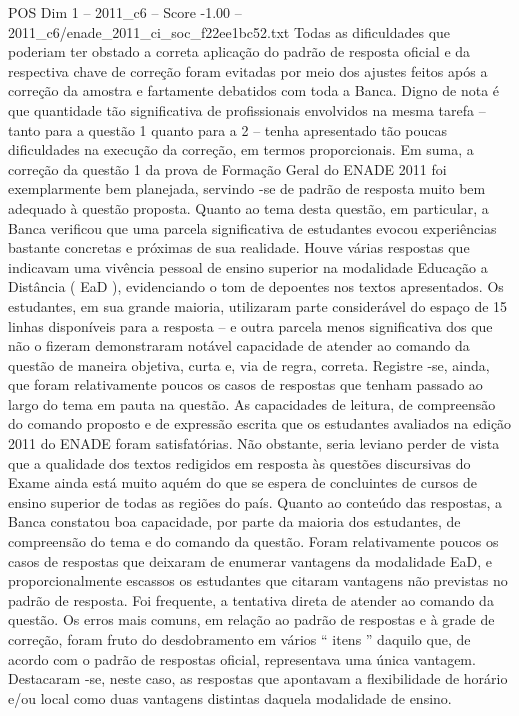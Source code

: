\begin{textsample}{POS Dim 1 – 2011\_c6 – Score -1.00 – 2011\_c6/enade\_2011\_ci\_soc\_f22ee1bc52.txt}
Todas as dificuldades que poderiam ter obstado a correta aplicação do padrão de resposta oficial e da respectiva chave de correção foram evitadas por meio dos ajustes feitos após a correção da amostra e fartamente debatidos com toda a Banca.
Digno de nota é que quantidade tão significativa de profissionais envolvidos na mesma tarefa – tanto para a questão 1 quanto para a 2 – tenha apresentado tão poucas dificuldades na execução da correção, em termos proporcionais.
Em suma, a correção da questão 1 da prova de Formação Geral do ENADE 2011 foi exemplarmente bem planejada, servindo -se de padrão de resposta muito bem adequado à questão proposta.
Quanto ao tema desta questão, em particular, a Banca verificou que uma parcela significativa de estudantes evocou experiências bastante concretas e próximas de sua realidade.
Houve várias respostas que indicavam uma vivência pessoal de ensino superior na modalidade Educação a Distância ( EaD ), evidenciando o tom de depoentes nos textos apresentados.
Os estudantes, em sua grande maioria, utilizaram parte considerável do espaço de 15 linhas disponíveis para a resposta – e outra parcela menos significativa dos que não o fizeram demonstraram notável capacidade de atender ao comando da questão de maneira objetiva, curta e, via de regra, correta.
Registre -se, ainda, que foram relativamente poucos os casos de respostas que tenham passado ao largo do tema em pauta na questão.
As capacidades de leitura, de compreensão do comando proposto e de expressão escrita que os estudantes avaliados na edição 2011 do ENADE foram satisfatórias.
Não obstante, seria leviano perder de vista que a qualidade dos textos redigidos em resposta às questões discursivas do Exame ainda está muito aquém do que se espera de concluintes de cursos de ensino superior de todas as regiões do país.
Quanto ao conteúdo das respostas, a Banca constatou boa capacidade, por parte da maioria dos estudantes, de compreensão do tema e do comando da questão.
Foram relativamente poucos os casos de respostas que deixaram de enumerar vantagens da modalidade EaD, e proporcionalmente escassos os estudantes que citaram vantagens não previstas no padrão de resposta.
Foi frequente, a tentativa direta de atender ao comando da questão.
Os erros mais comuns, em relação ao padrão de respostas e à grade de correção, foram fruto do desdobramento em vários “ itens ” daquilo que, de acordo com o padrão de respostas oficial, representava uma única vantagem.
Destacaram -se, neste caso, as respostas que apontavam a flexibilidade de horário e/ou local como duas vantagens distintas daquela modalidade de ensino.

\end{textsample}
